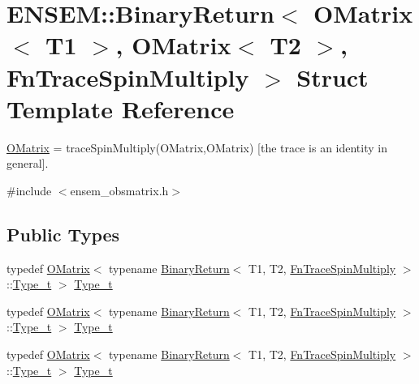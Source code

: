 \hypertarget{structENSEM_1_1BinaryReturn_3_01OMatrix_3_01T1_01_4_00_01OMatrix_3_01T2_01_4_00_01FnTraceSpinMultiply_01_4}{}\section{E\+N\+S\+EM\+:\+:Binary\+Return$<$ O\+Matrix$<$ T1 $>$, O\+Matrix$<$ T2 $>$, Fn\+Trace\+Spin\+Multiply $>$ Struct Template Reference}
\label{structENSEM_1_1BinaryReturn_3_01OMatrix_3_01T1_01_4_00_01OMatrix_3_01T2_01_4_00_01FnTraceSpinMultiply_01_4}


\mbox{\hyperlink{classENSEM_1_1OMatrix}{O\+Matrix}} = trace\+Spin\+Multiply(\+O\+Matrix,\+O\+Matrix) \mbox{[}the trace is an identity in general\mbox{]}.  




{\ttfamily \#include $<$ensem\+\_\+obsmatrix.\+h$>$}

\subsection*{Public Types}
\begin{DoxyCompactItemize}
\item 
typedef \mbox{\hyperlink{classENSEM_1_1OMatrix}{O\+Matrix}}$<$ typename \mbox{\hyperlink{structENSEM_1_1BinaryReturn}{Binary\+Return}}$<$ T1, T2, \mbox{\hyperlink{structENSEM_1_1FnTraceSpinMultiply}{Fn\+Trace\+Spin\+Multiply}} $>$\+::\mbox{\hyperlink{structENSEM_1_1BinaryReturn_3_01OMatrix_3_01T1_01_4_00_01OMatrix_3_01T2_01_4_00_01FnTraceSpinMultiply_01_4_a3c030373855e8dde629b2051471b5d72}{Type\+\_\+t}} $>$ \mbox{\hyperlink{structENSEM_1_1BinaryReturn_3_01OMatrix_3_01T1_01_4_00_01OMatrix_3_01T2_01_4_00_01FnTraceSpinMultiply_01_4_a3c030373855e8dde629b2051471b5d72}{Type\+\_\+t}}
\item 
typedef \mbox{\hyperlink{classENSEM_1_1OMatrix}{O\+Matrix}}$<$ typename \mbox{\hyperlink{structENSEM_1_1BinaryReturn}{Binary\+Return}}$<$ T1, T2, \mbox{\hyperlink{structENSEM_1_1FnTraceSpinMultiply}{Fn\+Trace\+Spin\+Multiply}} $>$\+::\mbox{\hyperlink{structENSEM_1_1BinaryReturn_3_01OMatrix_3_01T1_01_4_00_01OMatrix_3_01T2_01_4_00_01FnTraceSpinMultiply_01_4_a3c030373855e8dde629b2051471b5d72}{Type\+\_\+t}} $>$ \mbox{\hyperlink{structENSEM_1_1BinaryReturn_3_01OMatrix_3_01T1_01_4_00_01OMatrix_3_01T2_01_4_00_01FnTraceSpinMultiply_01_4_a3c030373855e8dde629b2051471b5d72}{Type\+\_\+t}}
\item 
typedef \mbox{\hyperlink{classENSEM_1_1OMatrix}{O\+Matrix}}$<$ typename \mbox{\hyperlink{structENSEM_1_1BinaryReturn}{Binary\+Return}}$<$ T1, T2, \mbox{\hyperlink{structENSEM_1_1FnTraceSpinMultiply}{Fn\+Trace\+Spin\+Multiply}} $>$\+::\mbox{\hyperlink{structENSEM_1_1BinaryReturn_3_01OMatrix_3_01T1_01_4_00_01OMatrix_3_01T2_01_4_00_01FnTraceSpinMultiply_01_4_a3c030373855e8dde629b2051471b5d72}{Type\+\_\+t}} $>$ \mbox{\hyperlink{structENSEM_1_1BinaryReturn_3_01OMatrix_3_01T1_01_4_00_01OMatrix_3_01T2_01_4_00_01FnTraceSpinMultiply_01_4_a3c030373855e8dde629b2051471b5d72}{Type\+\_\+t}}
\end{DoxyCompactItemize}


